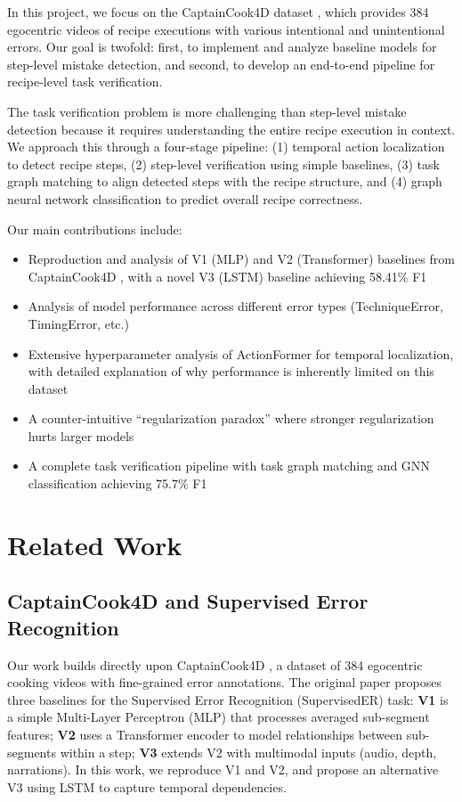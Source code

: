 \documentclass[10pt,twocolumn,letterpaper]{article}
\begin{document}
In this project, we focus on the CaptainCook4D dataset \cite{peddi2024captaincook4d}, which provides 384 egocentric videos of recipe executions with various intentional and unintentional errors. Our goal is twofold: first, to implement and analyze baseline models for step-level mistake detection, and second, to develop an end-to-end pipeline for recipe-level task verification.

The task verification problem is more challenging than step-level mistake detection because it requires understanding the entire recipe execution in context. We approach this through a four-stage pipeline: (1) temporal action localization to detect recipe steps, (2) step-level verification using simple baselines, (3) task graph matching to align detected steps with the recipe structure, and (4) graph neural network classification to predict overall recipe correctness.

Our main contributions include:
\begin{itemize}
    \item Reproduction and analysis of V1 (MLP) and V2 (Transformer) baselines from CaptainCook4D \cite{peddi2024captaincook4d}, with a novel V3 (LSTM) baseline achieving 58.41\% F1
    \item Analysis of model performance across different error types (TechniqueError, TimingError, etc.)
    \item Extensive hyperparameter analysis of ActionFormer for temporal localization, with detailed explanation of why performance is inherently limited on this dataset
    \item A counter-intuitive ``regularization paradox'' where stronger regularization hurts larger models
    \item A complete task verification pipeline with task graph matching and GNN classification achieving 75.7\% F1
\end{itemize}

\section{Related Work}

\subsection{CaptainCook4D and Supervised Error Recognition}

Our work builds directly upon CaptainCook4D \cite{peddi2024captaincook4d}, a dataset of 384 egocentric cooking videos with fine-grained error annotations. The original paper proposes three baselines for the Supervised Error Recognition (SupervisedER) task: \textbf{V1} is a simple Multi-Layer Perceptron (MLP) that processes averaged sub-segment features; \textbf{V2} uses a Transformer encoder to model relationships between sub-segments within a step; \textbf{V3} extends V2 with multimodal inputs (audio, depth, narrations). In this work, we reproduce V1 and V2, and propose an alternative V3 using LSTM to capture temporal dependencies.
\end{document}
